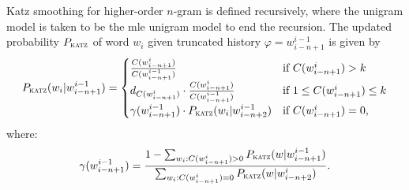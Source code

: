 	Katz smoothing for higher-order $n$-gram is defined recursively, where the unigram model is taken to be the \gls{mle} unigram model to end the recursion. The updated probability $P_{\textsc{katz}}$ of word $w_{i}$ given truncated history $\varphi=w_{i-n+1}^{i-1}$ is given by
	\begin{equation}
		P_{\textsc{katz}}(w_{i}|w_{i-n+1}^{i-1})=
		\begin{cases}
			\frac{C(w_{i-n+1}^{i})}{C(w_{i-n+1}^{i-1})}& \text{if }C(w_{i-n+1}^{i}) > k\\
			d_{C(w_{i-n+1}^{i})}\cdot \frac{C(w_{i-n+1}^{i})}{C(w_{i-n+1}^{i-1})}& \text{if } 1\leq C(w_{i-n+1}^{i})\leq k\\
			\gamma(w_{i-n+1}^{i-1})\cdot P_{\textsc{katz}}(w_{i}|w_{i-n+2}^{i-1})& \text{if } C(w_{i-n+1}^{i})=0,
		\end{cases}
	\end{equation}
	where:
	\begin{equation}
		\gamma(w_{i-n+1}^{i-1})=\frac{1-\sum_{w_{i}:C(w_{i-n+1}^{i})>0}P_{\textsc{katz}}(w|w_{i-n+1}^{i-1})}{\sum_{w_{i}:C(w_{i-n+1}^{i})=0}P_{\textsc{katz}}(w|w_{i-n+2}^{i})}.
	\end{equation}

